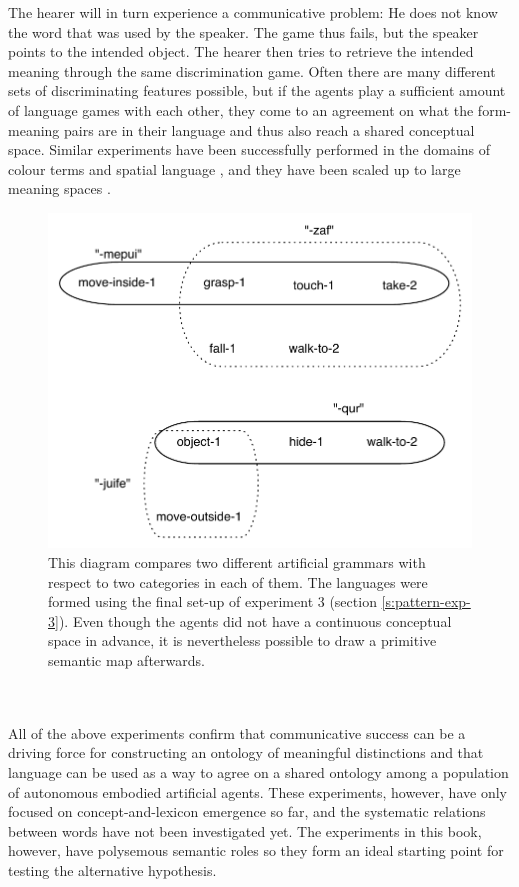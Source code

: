 The hearer will in turn experience a communicative problem: He does not know the word that was used by the speaker. The game thus fails, but the speaker points to the intended object. The hearer then tries to retrieve the intended meaning through the same discrimination game. Often there are many different sets of discriminating features possible, but if the agents play a sufficient amount of language games with each other, they come to an agreement on what the form-meaning pairs are in their language and thus also reach a shared conceptual space. Similar experiments have been successfully performed in the domains of colour terms \citep{steels05coordinating} and spatial language \citep{steels08perspective-alignment}, and they have been scaled up to large meaning spaces \citep{wellens08coping}.
\begin{figure}[t]
\centerline{\includegraphics[scale=0.7]{Chapter5/figs/sem-map1}}
  \caption[Two `semantic maps' from the experiments]{This diagram compares two different artificial grammars with respect to two categories in each of them. The languages were formed using the final set-up of experiment 3 (section \ref{s:pattern-exp-3}). Even though the agents did not have a continuous conceptual space in advance, it is nevertheless possible to draw a primitive semantic map afterwards.}
   \label{f:semmap-1}
\end{figure}
\\
\\
 All of the above experiments confirm that communicative success can be a driving force for constructing an ontology of meaningful distinctions and that language can be used as a way to agree on a shared ontology among a population of autonomous embodied artificial agents. These experiments, however, have only focused on concept-and-lexicon emergence so far, and the systematic relations between words have not been investigated yet. The experiments in this book, however, have polysemous semantic roles so they form an ideal starting point for testing the alternative hypothesis.

